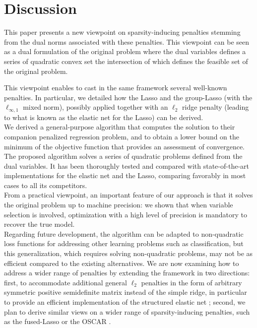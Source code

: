 \section{Discussion}


This paper presents a new viewpoint on sparsity-inducing penalties
stemming from the dual norms associated with these penalties. This
viewpoint can be seen as a dual formulation of the original problem
where the dual variables defines a series of quadratic convex set the
intersection of which defines the feasible set of the original
problem.

This  viewpoint  enables  to  cast   in  the  same  framework  several
well-known penalties. In particular, we detailed how the Lasso and the
group-Lasso (with the $\ell_{\infty,1}$  mixed norm), possibly applied
together with an  $\ell_2$ ridge penalty (leading to what  is known as
the elastic net for the Lasso) can be derived. 
\\

We derived a  general-purpose algorithm that computes  the solution to
their companion  penalized regression problem,  and to obtain  a lower
bound  on the  minimum  of  the objective  function  that provides  an
assessment of convergence.  The proposed  algorithm solves a series of
quadratic  problems defined  from  the dual  variables.   It has  been
thoroughly tested  and compared with  state-of-the-art implementations
for the elastic  net and the Lasso, comparing favorably  in most cases
to all its competitors.%
\\

From a  practical viewpoint, an  important feature of our  approach is
that it solves the original problem  up to machine precision: we shown
that when  variable selection  is involved,  optimization with  a high
level of precision is mandatory to recover the true model.
\\

Regarding  future  development,  the   algorithm  can  be  adapted  to
non-quadratic loss  functions for  addressing other  learning problems
such  as  classification,  but  this  generalization,  which  requires
solving non-quadratic  problems, may not  be as efficient  compared to
the  existing alternatives.   We are  now examining  how to  address a
wider range of penalties by extending the framework in two directions:
first,  to accommodate  additional general  $\ell_2$ penalties  in the
form of  arbitrary symmetric  positive semidefinite matrix  instead of
the simple ridge, in particular to provide an efficient implementation
of the  structured elastic  net \citep{2010_AOS_Slawski} ;  second, we
plan to  derive similar  views on a  wider range  of sparsity-inducing
penalties, such as the fused-Lasso or the OSCAR \citep{Bondell08}.
